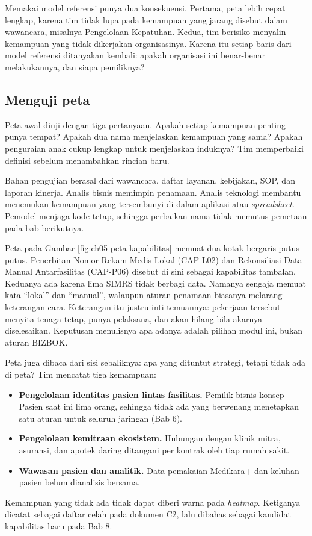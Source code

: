 Memakai model referensi punya dua konsekuensi. Pertama, peta lebih cepat lengkap, karena
tim tidak lupa pada kemampuan yang jarang disebut dalam wawancara, misalnya Pengelolaan
Kepatuhan. Kedua, tim berisiko menyalin kemampuan yang tidak dikerjakan organisasinya.
Karena itu setiap baris dari model referensi ditanyakan kembali: apakah organisasi ini
benar-benar melakukannya, dan siapa pemiliknya?

\subsection*{Menguji peta}

Peta awal diuji dengan tiga pertanyaan. Apakah setiap kemampuan penting punya tempat? Apakah
dua nama menjelaskan kemampuan yang sama? Apakah penguraian anak cukup lengkap untuk
menjelaskan induknya? Tim memperbaiki definisi sebelum menambahkan rincian baru.

Bahan pengujian berasal dari wawancara, daftar layanan, kebijakan, SOP, dan laporan
kinerja. Analis bisnis memimpin penamaan. Analis teknologi membantu menemukan kemampuan yang
tersembunyi di dalam aplikasi atau \textit{spreadsheet}. Pemodel menjaga kode tetap, sehingga
perbaikan nama tidak memutus pemetaan pada bab berikutnya.

\begin{kasus}[title={Kasus Medikara Health: Kapabilitas Tambalan dan Kapabilitas yang Belum Ada}]
  Peta pada Gambar \ref{fig:ch05-peta-kapabilitas} memuat dua kotak bergaris putus-putus.
  Penerbitan Nomor Rekam Medis Lokal (CAP-L02) dan Rekonsiliasi Data Manual Antarfasilitas
  (CAP-P06) disebut di sini sebagai kapabilitas tambalan. Keduanya ada karena lima SIMRS
  tidak berbagi data. Namanya sengaja memuat kata ``lokal'' dan ``manual'', walaupun aturan
  penamaan biasanya melarang keterangan cara. Keterangan itu justru inti temuannya: pekerjaan
  tersebut menyita tenaga tetap, punya pelaksana, dan akan hilang bila akarnya diselesaikan.
  Keputusan menulisnya apa adanya adalah pilihan modul ini, bukan aturan BIZBOK.

  Peta juga dibaca dari sisi sebaliknya: apa yang dituntut strategi, tetapi tidak ada di
  peta? Tim mencatat tiga kemampuan:

  \begin{itemize}
    \item \textbf{Pengelolaan identitas pasien lintas fasilitas.} Pemilik bisnis konsep
          Pasien saat ini lima orang, sehingga tidak ada yang berwenang menetapkan satu
          aturan untuk seluruh jaringan (Bab 6).
    \item \textbf{Pengelolaan kemitraan ekosistem.} Hubungan dengan klinik mitra, asuransi,
          dan apotek daring ditangani per kontrak oleh tiap rumah sakit.
    \item \textbf{Wawasan pasien dan analitik.} Data pemakaian Medikara+ dan keluhan pasien
          belum dianalisis bersama.
  \end{itemize}

  Kemampuan yang tidak ada tidak dapat diberi warna pada \textit{heatmap}. Ketiganya dicatat
  sebagai daftar celah pada dokumen C2, lalu dibahas sebagai kandidat kapabilitas baru pada
  Bab 8.
\end{kasus}

